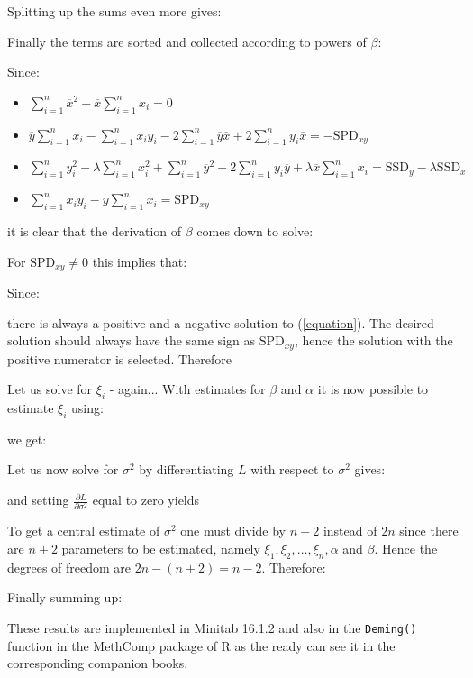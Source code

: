 	Splitting up the sums even more gives:
	
Finally the terms are sorted and collected according to powers of $\beta$:
	
	Since:
	\begin{itemize}
		\item
		$\displaystyle\sum_{i=1}^n\overline{x}^2
		-\overline{x}\displaystyle\sum_{i=1}^nx_i=0$
		\item
		$\overline{y}\displaystyle\sum_{i=1}^nx_i
		-\displaystyle\sum_{i=1}^nx_iy_i
		-2\displaystyle\sum_{i=1}^n\overline{y}\overline{x}
		+2\displaystyle\sum_{i=1}^ny_i\overline{x}=-\text{SPD}_{xy}$
		\item
		$\displaystyle\sum_{i=1}^ny_i^2
		-\lambda\displaystyle\sum_{i=1}^nx_i^2
		+\displaystyle\sum_{i=1}^n\overline{y}^2
		-2\displaystyle\sum_{i=1}^ny_i\overline{y}
		+\lambda\overline{x}\displaystyle\sum_{i=1}^nx_i
		=\text{SSD}_y-\lambda\text{SSD}_x$
		\item
		$\displaystyle\sum_{i=1}^nx_iy_i
		-\overline{y}\displaystyle\sum_{i=1}^nx_i=\text{SPD}_{xy}$
	\end{itemize}
	it is clear that the derivation of $\beta$ comes down to solve:
	
	For $\text{SPD}_{xy}\neq 0$ this implies that:
	
	Since:
	
	there is always a positive and a negative solution to (\ref{equation}). The desired solution should always have the same sign as $\text{SPD}_{xy}$, hence the solution with the positive numerator is selected. Therefore
	

	Let us solve for $\xi_i$ - again... With estimates for $\beta$ and $\alpha$ it is now possible to estimate $\xi_i$ using:
	
	we get:
	

	Let us now solve for $\sigma^2$ by differentiating $L$ with respect to $\sigma^2$ gives:
	
	and setting $\frac{\partial L}{\partial \sigma^2}$ equal to zero yields
	
	To get a central estimate of $\sigma^2$ one must divide by $n-2$
instead of $2n$ since there are $n+2$ parameters to be estimated,
namely $\xi_1,\xi_2,\ldots,\xi_n,\alpha$ and $\beta$. Hence the
degrees of freedom are $2n-(n+2)=n-2$. Therefore:
	
	Finally summing up:
	
	These results are implemented in Minitab 16.1.2 and also in the \texttt{Deming()} function in the MethComp package of R as the ready can see it in the corresponding companion books.

